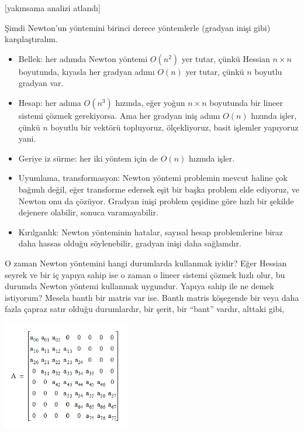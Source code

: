 \documentclass[12pt,fleqn]{article}\usepackage{../../common}
\begin{document}
[yakınsama analizi atlandı]

Şimdi Newton'un yöntemini birinci derece yöntemlerle (gradyan inişi gibi)
karşılaştıralım.

\begin{itemize}
   \item Bellek: her adımda Newton yöntemi $O(n^2)$ yer tutar, çünkü
     Hessian $n \times n$ boyutunda, kıyasla her gradyan adımı $O(n)$ yer
     tutar, çünkü $n$ boyutlu gradyan var. 

   \item Hesap: her adıma $O(n^3)$ hızında, eğer yoğun $n \times n$
     boyutunda bir lineer sistemi çözmek gerekiyorsa. Ama her gradyan iniş
     adımı $O(n)$ hızında işler, çünkü $n$ boyutlu bir vektörü topluyoruz,
     ölçekliyoruz, basit işlemler yapıyoruz yani.

   \item Geriye iz sürme: her iki yöntem için de $O(n)$ hızında işler. 

   \item Uyumlama, transformasyon: Newton yöntemi problemin mevcut haline
     çok bağımlı değil, eğer transforme edersek eşit bir başka problem elde
     ediyoruz, ve Newton onu da çözüyor. Gradyan inişi problem çeşidine
     göre hızlı bir şekilde dejenere olabilir, sonuca varamayabilir.
     
   \item Kırılganlık: Newton yönteminin hatalar, sayısal hesap
     problemlerine biraz daha hassas olduğu söylenebilir, gradyan inişi
     daha sağlamdır. 
\end{itemize}

O zaman Newton yöntemini hangi durumlarda kullanmak iyidir? Eğer Hessian
seyrek ve bir iç yapıya sahip ise o zaman o lineer sistemi çözmek hızlı
olur, bu durumda Newton yöntemi kullanmak uygundur. Yapıya sahip ile ne
demek istiyorum? Mesela bantlı bir matris var ise. Bantlı matris köşegende
bir veya daha fazla çapraz satır olduğu durumlardır, bir şerit, bir
``bant'' vardır, alttaki gibi,

\includegraphics[width=15em]{banded.png}
\end{document}
